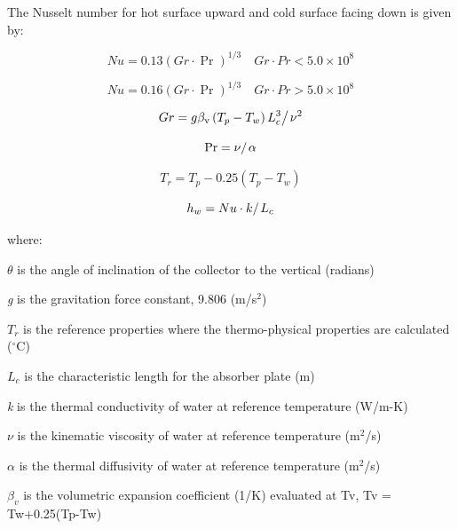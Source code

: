 The Nusselt number for hot surface upward and cold surface facing down is given by:

\begin{equation}
Nu = 0.13{\left( {Gr \cdot \Pr } \right)^{1/3}}\quad Gr \cdot Pr < 5.0 \times {10^8}
\end{equation}

\begin{equation}
Nu = 0.16{\left( {Gr \cdot \Pr } \right)^{1/3}}\quad Gr \cdot Pr > 5.0 \times {10^8}
\end{equation}

\begin{equation}
Gr = {{g{\beta_{\rm{v}}}\left( {{T_p} - {T_w}} \right)L_c^3} \mathord{\left/ {\vphantom {{g{\beta_{\rm{v}}}\left( {{T_p} - {T_w}} \right)L_c^3} {{\nu ^2}}}} \right. } {{\nu ^2}}}
\end{equation}

\begin{equation}
\Pr  = {\nu  \mathord{\left/ {\vphantom {\nu  \alpha }} \right. } \alpha }
\end{equation}

\begin{equation}
{T_r} = {T_p} - 0.25\left( {{T_p} - {T_w}} \right)
\end{equation}

\begin{equation}
{h_w} = {{Nu \cdot k} \mathord{\left/ {\vphantom {{Nu \cdot k} {{L_c}}}} \right. } {{L_c}}}
\end{equation}

where:

\(\theta\) is the angle of inclination of the collector to the vertical (radians)

\emph{g} is the gravitation force constant, 9.806 (m/s\(^{2}\))

\(T_{r}\) is the reference properties where the thermo-physical properties are calculated (\(^{\circ}\)C)

\(L_{c}\) is the characteristic length for the absorber plate (m)

\emph{k} is the thermal conductivity of water at reference temperature (W/m-K)

\({\nu}\) is the kinematic viscosity of water at reference temperature (m\(^{2}\)/s)

\(\alpha\) is the thermal diffusivity of water at reference temperature (m\(^{2}\)/s)

\(\beta_{v}\) is the volumetric expansion coefficient (1/K) evaluated at Tv, Tv = Tw+0.25(Tp-Tw)


